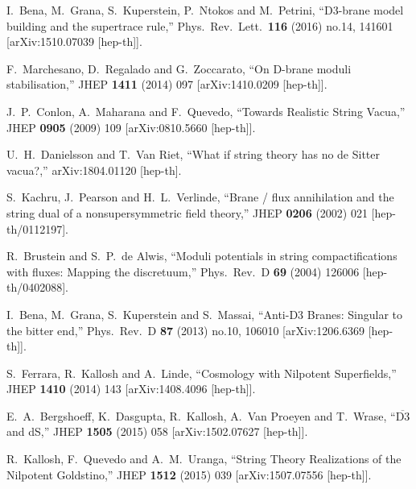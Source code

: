 \documentclass[11pt,a4paper]{article}
\begin{document}
\begin{itemize}
\begin{thebibliography}{99}
  I.~Bena, M.~Grana, S.~Kuperstein, P.~Ntokos and M.~Petrini,
  ``D3-brane model building and the supertrace rule,''
  Phys.\ Rev.\ Lett.\  {\bf 116} (2016) no.14,  141601
  [arXiv:1510.07039 [hep-th]].

  F.~Marchesano, D.~Regalado and G.~Zoccarato,
  ``On D-brane moduli stabilisation,''
  JHEP {\bf 1411} (2014) 097
  [arXiv:1410.0209 [hep-th]].

  J.~P.~Conlon, A.~Maharana and F.~Quevedo,
  ``Towards Realistic String Vacua,''
  JHEP {\bf 0905} (2009) 109
  [arXiv:0810.5660 [hep-th]].

  U.~H.~Danielsson and T.~Van Riet,
  ``What if string theory has no de Sitter vacua?,''
  arXiv:1804.01120 [hep-th].


  S.~Kachru, J.~Pearson and H.~L.~Verlinde,
  ``Brane / flux annihilation and the string dual of a nonsupersymmetric field theory,''
  JHEP {\bf 0206} (2002) 021
  [hep-th/0112197].

  R.~Brustein and S.~P.~de Alwis,
  ``Moduli potentials in string compactifications with fluxes: Mapping the discretuum,''
  Phys.\ Rev.\ D {\bf 69} (2004) 126006
  [hep-th/0402088].


  I.~Bena, M.~Grana, S.~Kuperstein and S.~Massai,
  ``Anti-D3 Branes: Singular to the bitter end,''
  Phys.\ Rev.\ D {\bf 87} (2013) no.10,  106010
  [arXiv:1206.6369 [hep-th]].


  S.~Ferrara, R.~Kallosh and A.~Linde,
  ``Cosmology with Nilpotent Superfields,''
  JHEP {\bf 1410} (2014) 143
  [arXiv:1408.4096 [hep-th]].

  E.~A.~Bergshoeff, K.~Dasgupta, R.~Kallosh, A.~Van Proeyen and T.~Wrase,
  ``$ \overline{\mathrm{D}3} $ and dS,''
  JHEP {\bf 1505} (2015) 058
  [arXiv:1502.07627 [hep-th]].

  R.~Kallosh, F.~Quevedo and A.~M.~Uranga,
  ``String Theory Realizations of the Nilpotent Goldstino,''
  JHEP {\bf 1512} (2015) 039
  [arXiv:1507.07556 [hep-th]].


\end{thebibliography}
\end{itemize}
\end{document}
